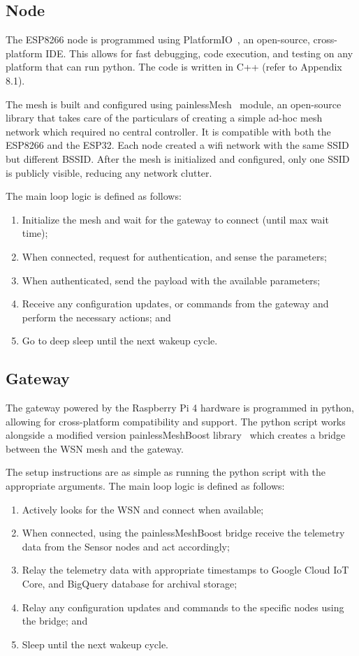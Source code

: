 \subsection{Node}
    The ESP8266 node is programmed using PlatformIO~\cite{platformio}, an open-source, cross-platform IDE. This allows for fast debugging, code execution, and testing on any platform that can run python. The code is written in C++ (refer to Appendix 8.1).

    \noindent
    The mesh is built and configured using painlessMesh~\cite{painlessMesh} module, an open-source library that takes care of the particulars of creating a simple ad-hoc mesh network which required no central controller. It is compatible with both the ESP8266 and the ESP32. Each node created a wifi network with the same SSID but different BSSID. After the mesh is initialized and configured, only one SSID is publicly visible, reducing any network clutter.

    \noindent
    The main loop logic is defined as follows:
    \begin{enumerate}
        \item Initialize the mesh and wait for the gateway to connect (until max wait time);
        \item When connected, request for authentication, and sense the parameters;
        \item When authenticated, send the payload with the available parameters;
        \item Receive any configuration updates, or commands from the gateway and perform the necessary actions; and
        \item Go to deep sleep until the next wakeup cycle.
    \end{enumerate}

\subsection{Gateway}
    The gateway powered by the Raspberry Pi 4 hardware is programmed in python, allowing for cross-platform compatibility and support. The python script works alongside a modified version painlessMeshBoost library~\cite{painlessMeshBoost} which creates a bridge between the WSN mesh and the gateway.

    \noindent
    The setup instructions are as simple as running the python script with the appropriate arguments. The main loop logic is defined as follows:
    \begin{enumerate}
        \item Actively looks for the WSN and connect when available;
        \item When connected, using the painlessMeshBoost bridge receive the telemetry data from the Sensor nodes and act accordingly;
        \item Relay the telemetry data with appropriate timestamps to Google Cloud IoT Core, and BigQuery database for archival storage;
        \item Relay any configuration updates and commands to the specific nodes using the bridge; and
        \item Sleep until the next wakeup cycle.
    \end{enumerate}